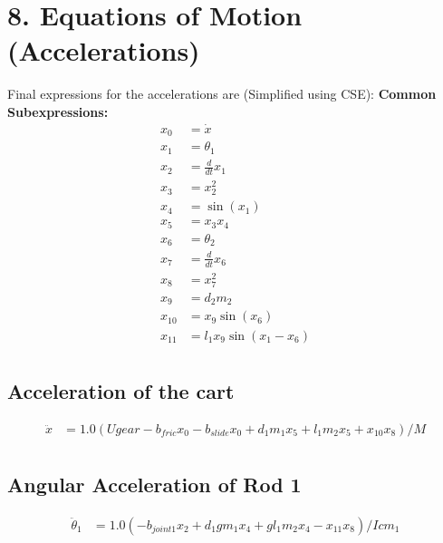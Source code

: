 \documentclass{article}%
\begin{document}
%
\section{8. Equations of Motion (Accelerations)}%
\label{sec:8.EquationsofMotion(Accelerations)}%
Final expressions for the accelerations are (Simplified using CSE):%
\textbf{Common Subexpressions:}\\ \vspace{0.5em}%
\begin{align*}%
x_{0} &= \displaystyle \dot{x} \\%
x_{1} &= \displaystyle \theta_1 \\%
x_{2} &= \displaystyle \frac{d}{d t} x_{1} \\%
x_{3} &= \displaystyle x_{2}^{2} \\%
x_{4} &= \displaystyle \sin(x_{1} ) \\%
x_{5} &= \displaystyle x_{3} x_{4} \\%
x_{6} &= \displaystyle \theta_2 \\%
x_{7} &= \displaystyle \frac{d}{d t} x_{6} \\%
x_{8} &= \displaystyle x_{7}^{2} \\%
x_{9} &= \displaystyle d_{2} m_{2} \\%
x_{10} &= \displaystyle x_{9} \sin(x_{6} ) \\%
x_{11} &= \displaystyle l_{1} x_{9} \sin(x_{1} - x_{6} ) \\%
\end{align*}%
\vspace{1em}%
\subsection{Acceleration of the cart}%
\label{subsec:Accelerationofthecart}%
\begin{align*}%
\ddot{x} &= \displaystyle 1.0 \left(U gear - b_{fric} x_{0} - b_{slide} x_{0} + d_{1} m_{1} x_{5} + l_{1} m_{2} x_{5} + x_{10} x_{8}\right) / M \\%
\end{align*}

%
\subsection{Angular Acceleration of Rod 1}%
\label{subsec:AngularAccelerationofRod1}%
\begin{align*}%
\ddot{\theta}_1 &= \displaystyle 1.0 \left(- b_{joint1} x_{2} + d_{1} g m_{1} x_{4} + g l_{1} m_{2} x_{4} - x_{11} x_{8}\right) / Icm_{1} \\%
\end{align*}
\end{document}
